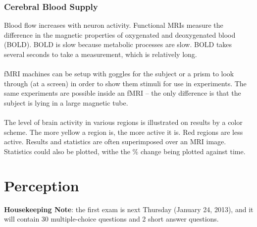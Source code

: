 \documentclass[]{article}
\newcommand{\lecture}[1]{\marginpar{{\footnotesize $\leftarrow$ \underline{#1}}}}
\begin{document}
			\subsubsection{Cerebral Blood Supply}
				Blood flow increases with neuron activity. Functional MRIs measure the difference in the magnetic properties of oxygenated and deoxygenated blood (BOLD). BOLD is slow because metabolic processes are slow. BOLD takes several seconds to take a measurement, which is relatively long.
				\\ \\
				fMRI machines can be setup with goggles for the subject or a prism to look through (at a screen) in order to show them stimuli for use in experiments. The same experiments are possible inside an fMRI -- the only difference is that the subject is lying in a large magnetic tube.
				\\ \\
				The level of brain activity in various regions is illustrated on results by a color scheme. The more yellow a region is, the more active it is. Red regions are less active. Results and statistics are often superimposed over an MRI image. Statistics could also be plotted, withe the \% change being plotted against time.
	\section{Perception} \lecture{January 17, 2013}
		\textbf{Housekeeping Note}: the first exam is next Thursday (January 24, 2013), and it will contain 30 multiple-choice questions and 2 short answer questions.
		
\end{document}
